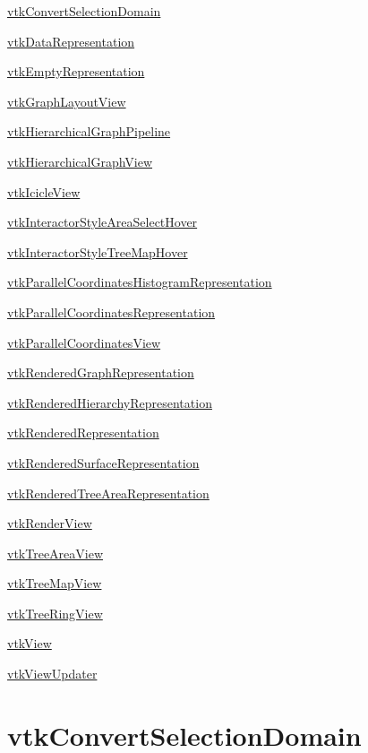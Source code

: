 
\begin{DoxyItemize}
\item \hyperlink{vtkviews_vtkconvertselectiondomain}{vtk\-Convert\-Selection\-Domain}  
\item \hyperlink{vtkviews_vtkdatarepresentation}{vtk\-Data\-Representation}  
\item \hyperlink{vtkviews_vtkemptyrepresentation}{vtk\-Empty\-Representation}  
\item \hyperlink{vtkviews_vtkgraphlayoutview}{vtk\-Graph\-Layout\-View}  
\item \hyperlink{vtkviews_vtkhierarchicalgraphpipeline}{vtk\-Hierarchical\-Graph\-Pipeline}  
\item \hyperlink{vtkviews_vtkhierarchicalgraphview}{vtk\-Hierarchical\-Graph\-View}  
\item \hyperlink{vtkviews_vtkicicleview}{vtk\-Icicle\-View}  
\item \hyperlink{vtkviews_vtkinteractorstyleareaselecthover}{vtk\-Interactor\-Style\-Area\-Select\-Hover}  
\item \hyperlink{vtkviews_vtkinteractorstyletreemaphover}{vtk\-Interactor\-Style\-Tree\-Map\-Hover}  
\item \hyperlink{vtkviews_vtkparallelcoordinateshistogramrepresentation}{vtk\-Parallel\-Coordinates\-Histogram\-Representation}  
\item \hyperlink{vtkviews_vtkparallelcoordinatesrepresentation}{vtk\-Parallel\-Coordinates\-Representation}  
\item \hyperlink{vtkviews_vtkparallelcoordinatesview}{vtk\-Parallel\-Coordinates\-View}  
\item \hyperlink{vtkviews_vtkrenderedgraphrepresentation}{vtk\-Rendered\-Graph\-Representation}  
\item \hyperlink{vtkviews_vtkrenderedhierarchyrepresentation}{vtk\-Rendered\-Hierarchy\-Representation}  
\item \hyperlink{vtkviews_vtkrenderedrepresentation}{vtk\-Rendered\-Representation}  
\item \hyperlink{vtkviews_vtkrenderedsurfacerepresentation}{vtk\-Rendered\-Surface\-Representation}  
\item \hyperlink{vtkviews_vtkrenderedtreearearepresentation}{vtk\-Rendered\-Tree\-Area\-Representation}  
\item \hyperlink{vtkviews_vtkrenderview}{vtk\-Render\-View}  
\item \hyperlink{vtkviews_vtktreeareaview}{vtk\-Tree\-Area\-View}  
\item \hyperlink{vtkviews_vtktreemapview}{vtk\-Tree\-Map\-View}  
\item \hyperlink{vtkviews_vtktreeringview}{vtk\-Tree\-Ring\-View}  
\item \hyperlink{vtkviews_vtkview}{vtk\-View}  
\item \hyperlink{vtkviews_vtkviewupdater}{vtk\-View\-Updater}  
\end{DoxyItemize}\hypertarget{vtkviews_vtkconvertselectiondomain}{}\section{vtk\-Convert\-Selection\-Domain}\label{vtkviews_vtkconvertselectiondomain}
